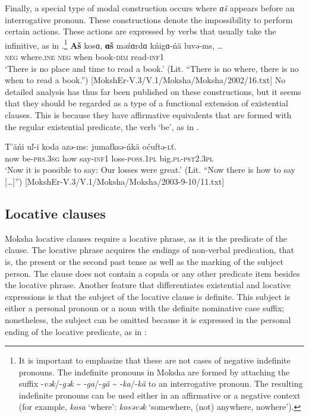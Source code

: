 \documentclass[output=paper]{langsci/langscibook}
\begin{document}
  Finally, a special type of modal construction occurs where \textit{ɑš} appears before an interrogative pronoun. These constructions denote the impossibility to perform certain actions. These actions are expressed by verbs that usually take the infinitive, as in .\footnote{It is important to emphasize that these are not cases of negative indefinite pronouns. The indefinite pronouns in Moksha are formed by attaching the suffix -\textit{vək}/-\textit{gək} {\textasciitilde} -\textit{ga}/-\textit{gä} {\textasciitilde} -\textit{ka}/-\textit{kä} to an interrogative pronoun. The resulting indefinite pronouns can be used either in an affirmative or a negative context (for example, \textit{kosa} `where': \textit{kosəvək} `somewhere, (not) anywhere, nowhere').} 
\ea\label{ex:moksha-book}
\gll \textbf{Aš} kosɑ, \textbf{ɑš} məźɑrdɑ kńigɑ-ńä luvə-ms,
\ob\ldots\cb\\
\textsc{neg}  where.\textsc{ine}  \textsc{neg}  when      book-\textsc{dim}    read-\textsc{inf1}\\
\glt `There is no place and time to read a book.' (Lit. ``There is no where, there is no when to read a book.'') [MokshEr-V.3/V.1/Moksha/Moksha/2002/16.txt]
\z
No detailed analysis has thus far been published on these constructions, but it seems that they should be regarded as a type of a functional extension of existential clauses. This is because they have affirmative equivalents that are formed with the regular existential predicate, the verb `be', as in .

\ea\label{ex:moksha-loss}
\gll T’äńi uľ-i koda azə-ms: jumafksə-ńkä  oćuftə-\textsc{ľ}ť.\\
now be-\textsc{prs.3sg} how say-\textsc{inf1} loss-\textsc{poss.1pl} big.\textsc{pl-pst2.3pl}\\
\glt `Now it is possible to say: Our losses were great.' (Lit. ``Now there is how to say [\ldots]'') [MokshEr-V.3/V.1/Moksha/Moksha/2003-9-10/11.txt]
\z

\subsection{Locative clauses}\label{sec:2:5.3}

Moksha locative clauses require a locative phrase, as it is the predicate of the clause. The locative phrase acquires the endings of non-verbal predication, that is, the present or the second past tense as well as the marking of the subject person. The clause does not contain a copula or any other predicate item besides the locative phrase. Another feature that differentiates existential and locative expressions is that the subject of the locative clause is definite. This subject is either a personal pronoun or a noun with the definite nominative case suffix; nonetheless, the subject can be omitted because it is expressed in the personal ending of the locative predicate, as in :
\end{document}
